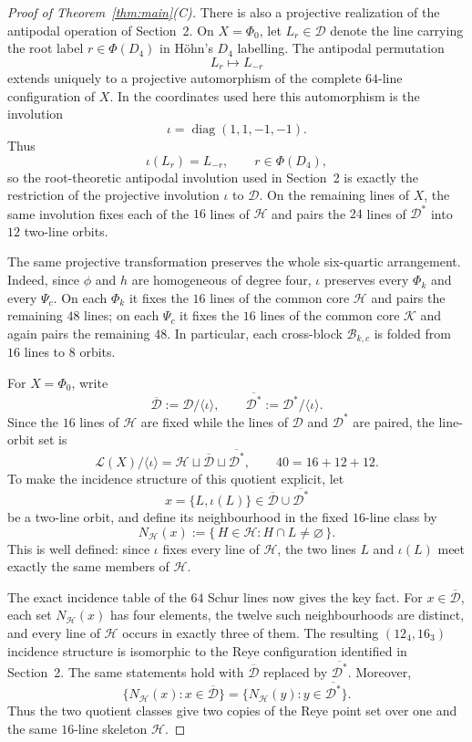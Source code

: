\documentclass[10pt]{article}
\begin{document}
\begin{proof}[Proof of Theorem~\ref{thm:main}\textup{(C)}]
There is also a projective realization of the antipodal operation of
Section~2.  On $X=\Phi_0$, let $L_r\in\mathcal D$ denote the line carrying
the root label $r\in\Phi(D_4)$ in H\"ohn's $D_4$ labelling.  The antipodal
permutation
\[
L_r\longmapsto L_{-r}
\]
extends uniquely to a projective automorphism of the complete $64$-line
configuration of $X$.  In the coordinates used here this automorphism is
the involution
\[
\iota=\operatorname{diag}(1,1,-1,-1).
\tag{4.14}
\]
Thus
\[
\iota(L_r)=L_{-r},
\qquad r\in\Phi(D_4),
\]
so the root-theoretic antipodal involution used in Section~2 is exactly the
restriction of the projective involution $\iota$ to $\mathcal D$.  On the
remaining lines of $X$, the same involution fixes each of the $16$ lines of
$\mathcal H$ and pairs the $24$ lines of $\mathcal D^*$ into $12$
two-line orbits.

The same projective transformation preserves the whole six-quartic
arrangement.  Indeed, since $\phi$ and $h$ are homogeneous of degree four,
$\iota$ preserves every $\Phi_k$ and every $\Psi_c$.  On each $\Phi_k$ it
fixes the $16$ lines of the common core $\mathcal H$ and pairs the remaining
$48$ lines; on each $\Psi_c$ it fixes the $16$ lines of the common core
$\mathcal K$ and again pairs the remaining $48$.  In particular, each
cross-block $\mathcal B_{k,c}$ is folded from $16$ lines to $8$ orbits.

For $X=\Phi_0$, write
\[
\overline{\mathcal D}
   :=\mathcal D/\langle\iota\rangle,
\qquad
\overline{\mathcal D^*}
   :=\mathcal D^*/\langle\iota\rangle .
\]
Since the $16$ lines of $\mathcal H$ are fixed while the lines of
$\mathcal D$ and $\mathcal D^*$ are paired, the line-orbit set is
\[
\mathcal L(X)/\langle\iota\rangle
 =\mathcal H\sqcup\overline{\mathcal D}\sqcup\overline{\mathcal D^*},
\qquad
40=16+12+12.
\tag{4.15}
\]
To make the incidence structure of this quotient explicit, let
\[
x=\{L,\iota(L)\}\in
\overline{\mathcal D}\cup\overline{\mathcal D^*}
\]
be a two-line orbit, and define its neighbourhood in the fixed
$16$-line class by
\[
N_{\mathcal H}(x)
:=
\{\,H\in\mathcal H:H\cap L\ne\varnothing\,\}.
\]
This is well defined: since $\iota$ fixes every line of $\mathcal H$,
the two lines $L$ and $\iota(L)$ meet exactly the same members of
$\mathcal H$.

The exact incidence table of the $64$ Schur lines now gives the key
fact.  For $x\in\overline{\mathcal D}$, each set
$N_{\mathcal H}(x)$ has four elements, the twelve such neighbourhoods
are distinct, and every line of $\mathcal H$ occurs in exactly three of
them.  The resulting $(12_4,16_3)$ incidence structure is isomorphic to
the Reye configuration identified in Section~2.  The same statements
hold with $\overline{\mathcal D}$ replaced by
$\overline{\mathcal D^*}$.  Moreover,
\[
\bigl\{N_{\mathcal H}(x):x\in\overline{\mathcal D}\bigr\}
=
\bigl\{N_{\mathcal H}(y):y\in\overline{\mathcal D^*}\bigr\}.
\]
Thus the two quotient classes give two copies of the Reye point set over
one and the same $16$-line skeleton $\mathcal H$.


\end{proof}
\end{document}
